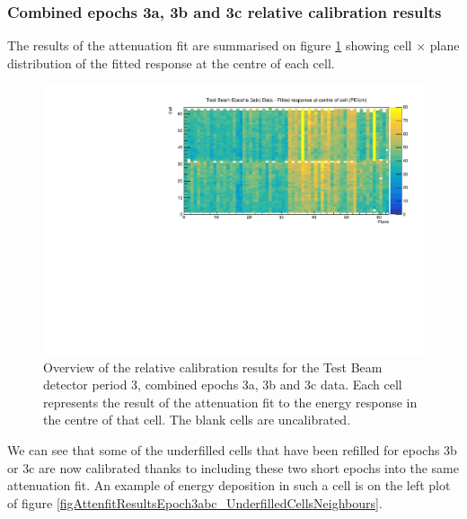 \documentclass[12pt,a4paper]{article}
\begin{document}
\subsubsection*{Combined epochs 3a, 3b and 3c relative calibration results}

The results of the attenuation fit are summarised on figure \ref{figCellCentreResponseEp3abc} showing cell $\times$ plane distribution of the fitted response at the centre of each cell.

\begin{figure}[!hbtp]
\centering
\includegraphics[width=\textwidth]{Plots/CellResponseAtCentre_epoch3abc_Limited.pdf}
\caption{Overview of the relative calibration results for the Test Beam detector period 3, combined epochs 3a, 3b and 3c data. Each cell represents the result of the attenuation fit to the energy response in the centre of that cell. The blank cells are uncalibrated.}
\label{figCellCentreResponseEp3abc}
\end{figure}

We can see that some of the underfilled cells that have been refilled for epochs 3b or 3c are now calibrated thanks to including these two short epochs into the same attenuation fit. An example of energy deposition in such a cell is on the left plot of figure \ref{figAttenfitResultsEpoch3abc_UnderfilledCellsNeighbours}.
\end{document}
